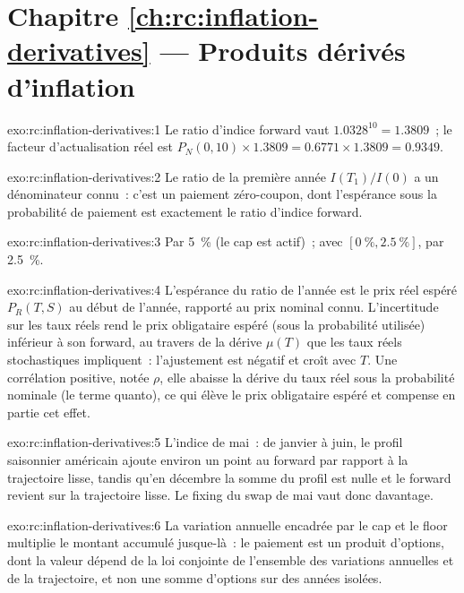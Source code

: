 \section*{Chapitre \ref{ch:rc:inflation-derivatives} --- Produits dérivés d'inflation}

\begin{solution}{exo:rc:inflation-derivatives:1}
Le ratio d'indice forward vaut $1.0328^{10} = 1.3809$~; le facteur d'actualisation réel est
$P_N(0,10)\times1.3809 = 0.6771\times1.3809 = 0.9349$.
\end{solution}

\begin{solution}{exo:rc:inflation-derivatives:2}
Le ratio de la première année $I(T_1)/I(0)$ a un dénominateur connu~: c'est un paiement zéro-coupon,
dont l'espérance sous la probabilité de paiement est exactement le ratio d'indice forward.
\end{solution}

\begin{solution}{exo:rc:inflation-derivatives:3}
Par 5~\% (le cap est actif)~; avec $[0~\%,2.5~\%]$, par 2.5~\%.
\end{solution}

\begin{solution}{exo:rc:inflation-derivatives:4}
L'espérance du ratio de l'année est le prix réel espéré $P_R(T,S)$ au
début de l'année, rapporté au prix nominal connu. L'incertitude sur les taux réels rend le prix
obligataire espéré (sous la probabilité utilisée) inférieur à son forward, au travers de la dérive $\mu(T)$ que
les taux réels stochastiques impliquent~: l'ajustement est négatif et croît avec $T$. Une corrélation positive, notée
$\rho$, elle abaisse la dérive du taux réel sous la probabilité nominale (le terme quanto), ce qui
élève le prix obligataire espéré et compense en partie cet effet.
\end{solution}

\begin{solution}{exo:rc:inflation-derivatives:5}
L'indice de mai~: de janvier à juin, le profil saisonnier américain ajoute environ un point au forward
par rapport à la trajectoire lisse, tandis qu'en décembre la somme du profil est nulle et le
forward revient sur la trajectoire lisse. Le fixing du swap de mai vaut donc davantage.
\end{solution}

\begin{solution}{exo:rc:inflation-derivatives:6}
La variation annuelle encadrée par le cap et le floor multiplie le montant accumulé jusque-là~: le paiement est
un produit d'options, dont la valeur dépend de la loi conjointe de l'ensemble des variations annuelles
et de la trajectoire, et non une somme d'options sur des années isolées.
\end{solution}

